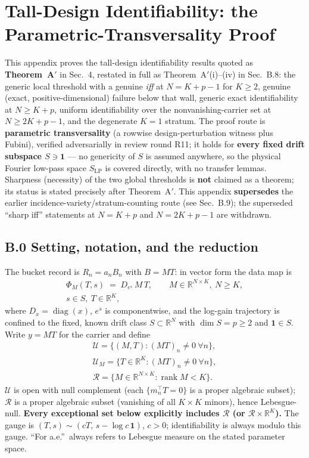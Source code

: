 \section{Tall-Design Identifiability: the Parametric-Transversality Proof}

This appendix proves the tall-design identifiability results quoted as \textbf{Theorem~A$'$} in Sec.~4, restated in full as Theorem~A$'$(i)--(iv) in Sec.~B.8: the generic local threshold with a genuine \emph{iff} at $N=K+p-1$ for $K\ge2$, genuine (exact, positive-dimensional) failure below that wall, generic exact identifiability at $N\ge K+p$, uniform identifiability over the nonvanishing-carrier set at $N\ge 2K+p-1$, and the degenerate $K=1$ stratum. The proof route is \textbf{parametric transversality} (a rowwise design-perturbation witness plus Fubini), verified adversarially in review round R11; it holds for \textbf{every fixed drift subspace $S\ni\mathbf 1$} --- no genericity of $S$ is assumed anywhere, so the physical Fourier low-pass space $S_{\mathrm{LP}}$ is covered directly, with no transfer lemmas. Sharpness (necessity) of the two global thresholds is \textbf{not} claimed as a theorem; its status is stated precisely after Theorem~A$'$. This appendix \textbf{supersedes} the earlier incidence-variety/stratum-counting route (see Sec.~B.9); the superseded ``sharp iff'' statements at $N=K+p$ and $N=2K+p-1$ are withdrawn.

\subsection{B.0 Setting, notation, and the reduction}

The bucket record is $R_n=a_nB_n$ with $B=MT$: in vector form the data map is
\[
\begin{gathered}
\Phi_M(T,s)\;=\;D_{e^{s}}\,M\,T,\qquad M\in\mathbb R^{N\times K},\ N\ge K,\\
s\in S,\ T\in\mathbb R^{K},
\end{gathered}
\]
where $D_x=\operatorname{diag}(x)$, $e^{s}$ is componentwise, and the log-gain trajectory is confined to the fixed, known drift class $S\subset\mathbb R^{N}$ with $\dim S=p\ge2$ and $\mathbf 1\in S$. Write $y=MT$ for the carrier and define
\[
\begin{gathered}
\mathcal U=\{(M,T):(MT)_n\neq0\ \forall n\},\\
\mathcal U_M=\{T\in\mathbb R^K:(MT)_n\neq0\ \forall n\},\\
\mathcal R=\{M\in\mathbb R^{N\times K}:\operatorname{rank}M<K\}.
\end{gathered}
\]
$\mathcal U$ is open with null complement (each $\{m_n^\top T=0\}$ is a proper algebraic subset); $\mathcal R$ is a proper algebraic subset (vanishing of all $K\times K$ minors), hence Lebesgue-null. \textbf{Every exceptional set below explicitly includes $\mathcal R$ (or $\mathcal R\times\mathbb R^K$).} The gauge is $(T,s)\sim(cT,\,s-\log c\,\mathbf 1)$, $c>0$; identifiability is always modulo this gauge. ``For a.e.''\ always refers to Lebesgue measure on the stated parameter space.

